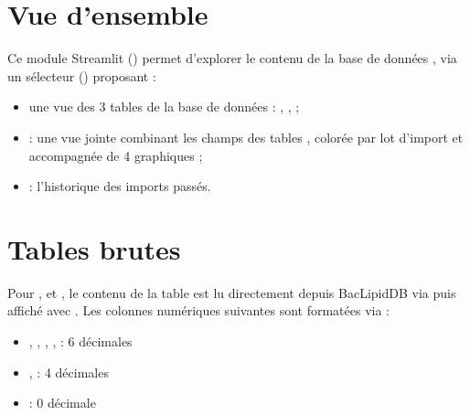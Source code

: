 \documentclass[letterpaper,10pt,english]{sphinxmanual}
\begin{document}
\section{Vue d’ensemble}
\label{\detokenize{2_BacLipidDB:vue-d-ensemble}}
\sphinxAtStartPar
Ce module Streamlit () permet d’explorer le contenu de la base de données
, via un sélecteur () proposant :
\begin{itemize}
\item {} 
\sphinxAtStartPar
une vue des 3 tables de la base de données : , ,  ;

\item {} 
\sphinxAtStartPar
{} : une vue jointe combinant les champs des tables ,
colorée par lot d’import et accompagnée de 4 graphiques ;

\item {} 
\sphinxAtStartPar
{} : l’historique des imports passés.

\end{itemize}


\section{Tables brutes}
\label{\detokenize{2_BacLipidDB:tables-brutes}}
\sphinxAtStartPar
Pour ,  et , le contenu de la table est lu
directement depuis BacLipidDB via  puis affiché avec
. Les colonnes numériques suivantes sont formatées via
 :
\begin{itemize}
\item {} 
\sphinxAtStartPar
{}, , , ,  : 6 décimales

\item {} 
\sphinxAtStartPar
{},  : 4 décimales

\item {} 
\sphinxAtStartPar
{} : 0 décimale

\end{itemize}
\end{document}
